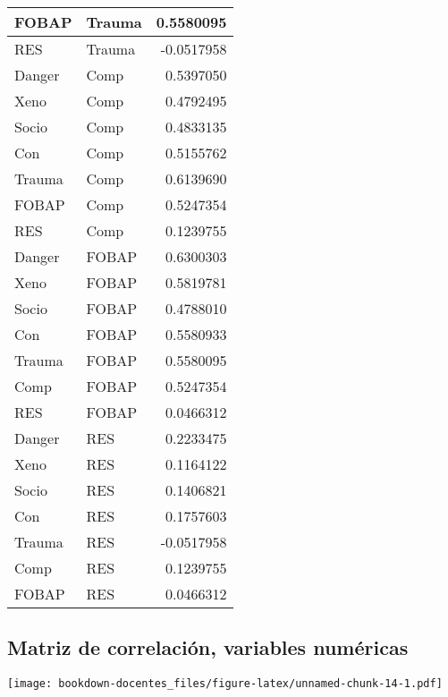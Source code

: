\documentclass[
]{book}
\begin{document}
\begin{table}[H]
\begin{tabular}[t]{l|l|r}
\hline
FOBAP & Trauma & 0.5580095\\
\hline
RES & Trauma & -0.0517958\\
\hline
Danger & Comp & 0.5397050\\
\hline
Xeno & Comp & 0.4792495\\
\hline
Socio & Comp & 0.4833135\\
\hline
Con & Comp & 0.5155762\\
\hline
Trauma & Comp & 0.6139690\\
\hline
FOBAP & Comp & 0.5247354\\
\hline
RES & Comp & 0.1239755\\
\hline
Danger & FOBAP & 0.6300303\\
\hline
Xeno & FOBAP & 0.5819781\\
\hline
Socio & FOBAP & 0.4788010\\
\hline
Con & FOBAP & 0.5580933\\
\hline
Trauma & FOBAP & 0.5580095\\
\hline
Comp & FOBAP & 0.5247354\\
\hline
RES & FOBAP & 0.0466312\\
\hline
Danger & RES & 0.2233475\\
\hline
Xeno & RES & 0.1164122\\
\hline
Socio & RES & 0.1406821\\
\hline
Con & RES & 0.1757603\\
\hline
Trauma & RES & -0.0517958\\
\hline
Comp & RES & 0.1239755\\
\hline
FOBAP & RES & 0.0466312\\
\hline
\end{tabular}
\end{table}

\hypertarget{matriz-de-correlaciuxf3n-variables-numuxe9ricas}{%
\subsection{Matriz de correlación, variables numéricas}\label{matriz-de-correlaciuxf3n-variables-numuxe9ricas}}

\texttt{[image: bookdown-docentes\_files/figure-latex/unnamed-chunk-14-1.pdf]}

  
\end{document}
